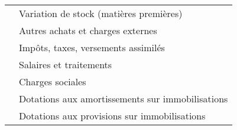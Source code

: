 \begin{table}[h]
\begin{tabular}{|l|p{6.5cm}|}
\cline{2-2}                                                                                                                                                  
                                                                                              & Variation de stock (matières premières)                                              \\ 
\cline{2-2}                                                                                                                                                  
                                                                                              & Autres achats et charges externes                                                    \\ 
\cline{2-2}                                                                                                                                                  
                                                                                              & Impôts, taxes, versements assimilés                                                  \\ 
\cline{2-2}                                                                                                                                                  
                                                                                              & Salaires et traitements                                                              \\ 
\cline{2-2}                                                                                                                                                                 
                                                                                              & Charges sociales	                                                                 \\ 
\cline{2-2}                                                                                                                                                                 
                                                                                              & Dotations aux amortissements sur immobilisations                                     \\ 
\cline{2-2}                                                                                                                                                                 
                                                                                              & Dotations aux provisions sur immobilisations                                         \\ 

\end{tabular}
\end{table}
